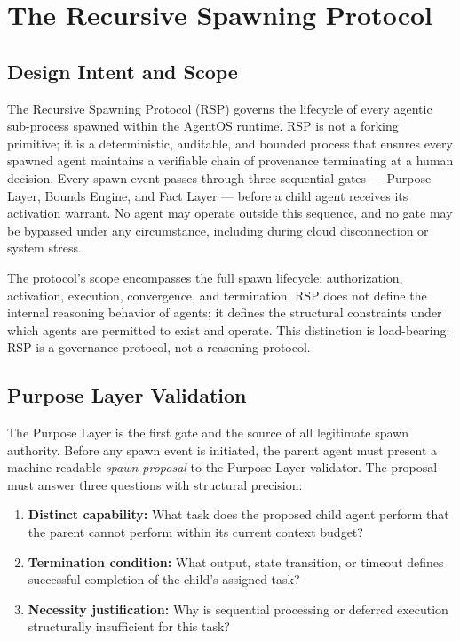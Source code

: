 \section{The Recursive Spawning Protocol}
\label{sec:recursive-spawning-protocol}

\subsection{Design Intent and Scope}
\label{sec:design-intent}

The Recursive Spawning Protocol (RSP) governs the lifecycle of every agentic sub-process spawned within the AgentOS runtime. RSP is not a forking primitive; it is a deterministic, auditable, and bounded process that ensures every spawned agent maintains a verifiable chain of provenance terminating at a human decision. Every spawn event passes through three sequential gates — Purpose Layer, Bounds Engine, and Fact Layer — before a child agent receives its activation warrant. No agent may operate outside this sequence, and no gate may be bypassed under any circumstance, including during cloud disconnection or system stress.

The protocol's scope encompasses the full spawn lifecycle: authorization, activation, execution, convergence, and termination. RSP does not define the internal reasoning behavior of agents; it defines the structural constraints under which agents are permitted to exist and operate. This distinction is load-bearing: RSP is a governance protocol, not a reasoning protocol.

\subsection{Purpose Layer Validation}
\label{sec:purpose-layer}

The Purpose Layer is the first gate and the source of all legitimate spawn authority. Before any spawn event is initiated, the parent agent must present a machine-readable \textit{spawn proposal} to the Purpose Layer validator. The proposal must answer three questions with structural precision:

\begin{enumerate}
    \itemsep0em
    \item \textbf{Distinct capability:} What task does the proposed child agent perform that the parent cannot perform within its current context budget?
    \item \textbf{Termination condition:} What output, state transition, or timeout defines successful completion of the child's assigned task?
    \item \textbf{Necessity justification:} Why is sequential processing or deferred execution structurally insufficient for this task?
\end{enumerate}

